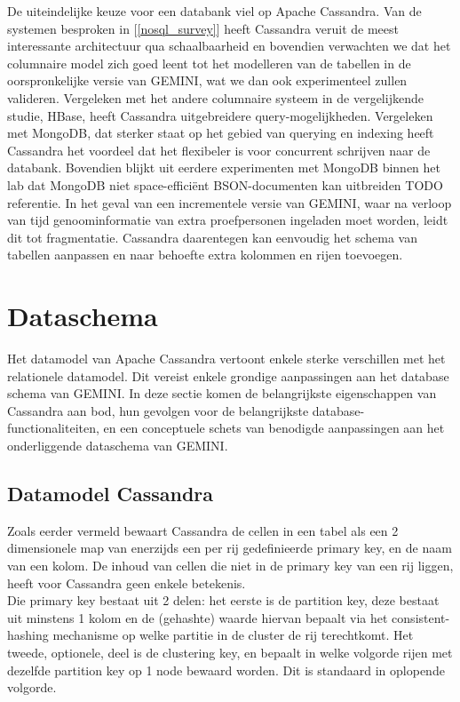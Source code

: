 De uiteindelijke keuze voor een databank viel op Apache Cassandra. Van de systemen besproken in [\ref{nosql_survey}] heeft Cassandra veruit de meest interessante architectuur qua schaalbaarheid en bovendien verwachten we dat het columnaire model zich goed leent tot het modelleren van de tabellen in de oorspronkelijke versie van GEMINI, wat we dan ook experimenteel zullen valideren. Vergeleken met het andere columnaire systeem in de vergelijkende studie, HBase, heeft Cassandra uitgebreidere query-mogelijkheden. Vergeleken met MongoDB, dat sterker staat op het gebied van querying en indexing heeft Cassandra het voordeel dat het flexibeler is voor concurrent schrijven naar de databank. Bovendien blijkt uit eerdere experimenten met MongoDB binnen het lab dat MongoDB niet space-effici\"ent BSON-documenten kan uitbreiden {\color{red} TODO referentie}. %
In het geval van een incrementele versie van GEMINI, waar na verloop van tijd genoominformatie van extra proefpersonen ingeladen moet worden, leidt dit tot fragmentatie. Cassandra daarentegen kan eenvoudig het schema van tabellen aanpassen en naar behoefte extra kolommen en rijen toevoegen.

\section{Dataschema}

\label{cassandra_datamodel}

Het datamodel van Apache Cassandra vertoont enkele sterke verschillen met het relationele datamodel. Dit vereist enkele grondige aanpassingen aan het database schema van GEMINI. In deze sectie komen de belangrijkste eigenschappen van Cassandra aan bod, hun gevolgen voor de belangrijkste database-functionaliteiten, en een conceptuele schets van benodigde aanpassingen aan het onderliggende dataschema van GEMINI.

\subsection{Datamodel Cassandra}

Zoals eerder vermeld bewaart Cassandra de cellen in een tabel als een 2 dimensionele map van enerzijds een per rij gedefinieerde primary key, en de naam van een kolom. De inhoud van cellen die niet in de primary key van een rij liggen, heeft voor Cassandra geen enkele betekenis.\\
Die primary key bestaat uit 2 delen: het eerste is de partition key, deze bestaat uit minstens 1 kolom en de (gehashte) waarde hiervan bepaalt via het consistent-hashing mechanisme op welke partitie in de cluster de rij terechtkomt. Het tweede, optionele, deel is de clustering key, en bepaalt in welke volgorde rijen met dezelfde partition key op 1 node bewaard worden. Dit is standaard in oplopende volgorde.\\

